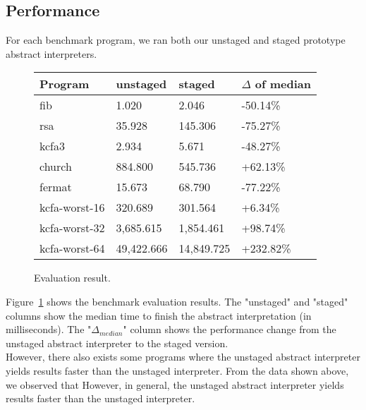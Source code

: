 \subsection{Performance}

For each benchmark program, we ran both our unstaged and staged prototype abstract interpreters.

\begin{figure}[h]
\begin{tabular}{@{}llll@{}}
\toprule
    Program            & unstaged   & staged     & $\Delta$ of median \\ \midrule
    fib                & 1.020      & 2.046      & -50.14\%          \\
    rsa                & 35.928     & 145.306    & -75.27\%          \\
    kcfa3              & 2.934      & 5.671      & -48.27\%          \\
    church             & 884.800    & 545.736    & +62.13\%          \\
    fermat             & 15.673     & 68.790     & -77.22\%          \\
    kcfa-worst-16      & 320.689    & 301.564    & +6.34\%           \\
    kcfa-worst-32      & 3,685.615  & 1,854.461  & +98.74\%          \\
    kcfa-worst-64      & 49,422.666 & 14,849.725 & +232.82\%         \\
    \bottomrule
\end{tabular}
\caption{Evaluation result.} \label{evaluation_result}
\end{figure}

Figure~\ref{evaluation_result} shows the benchmark evaluation results. The "unstaged" and "staged" columns
show the median time to finish the abstract interpretation (in milliseconds). The "$\Delta_{median}$"
column shows the performance change from the unstaged abstract interpreter to the staged version.\\

However, there also exists some programs where the unstaged abstract interpreter yields 
results faster than the unstaged interpreter.
From the data shown above, we observed that 
However, in general, the unstaged abstract interpreter yields results faster
than the unstaged interpreter.

